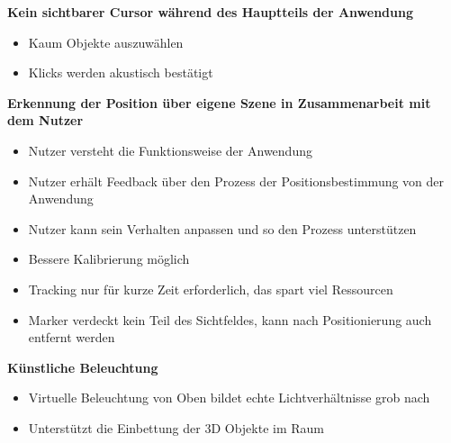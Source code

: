 \textbf{Kein sichtbarer Cursor während des Hauptteils der Anwendung}
\begin{itemize}
	\item Kaum Objekte auszuwählen
	\item Klicks werden akustisch bestätigt
\end{itemize}

\textbf{Erkennung der Position über eigene Szene in Zusammenarbeit mit dem Nutzer}
\begin{itemize}
	\item Nutzer versteht die Funktionsweise der Anwendung
	\item Nutzer erhält Feedback über den Prozess der Positionsbestimmung von der Anwendung
	\item Nutzer kann sein Verhalten anpassen und so den Prozess unterstützen
	\item Bessere Kalibrierung möglich
	\item Tracking nur für kurze Zeit erforderlich, das spart viel Ressourcen
	\item Marker verdeckt kein Teil des Sichtfeldes, kann nach Positionierung auch entfernt werden
\end{itemize}

\textbf{Künstliche Beleuchtung}
\begin{itemize}
	\item Virtuelle Beleuchtung von Oben bildet echte Lichtverhältnisse grob nach
	\item Unterstützt die Einbettung der 3D Objekte im Raum
\end{itemize}





